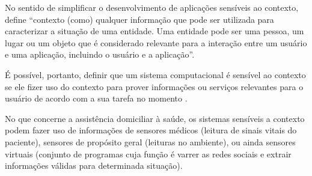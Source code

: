No sentido de simplificar o desenvolvimento de aplicações sensíveis ao
contexto,  define ``contexto (como) qualquer
informação que pode ser utilizada para caracterizar a situação de uma entidade.
Uma entidade pode ser uma pessoa, um lugar ou um objeto que é considerado
relevante para a interação entre um usuário e uma aplicação, incluindo o
usuário e a aplicação''.

É possível, portanto, definir que um sistema computacional é sensível ao contexto
se ele fizer uso do contexto para prover informações ou serviços relevantes para
o usuário de acordo com a sua tarefa no momento \cite{dey2001understanding}.

No que concerne a assistência domiciliar à saúde, os sistemas sensíveis a
contexto podem fazer uso de informações de sensores médicos (leitura de sinais 
vitais do paciente), sensores de propósito geral (leituras no ambiente), 
ou ainda sensores virtuais (conjunto de programas cuja função é varrer as redes 
sociais e extrair informações válidas para determinada situação).























